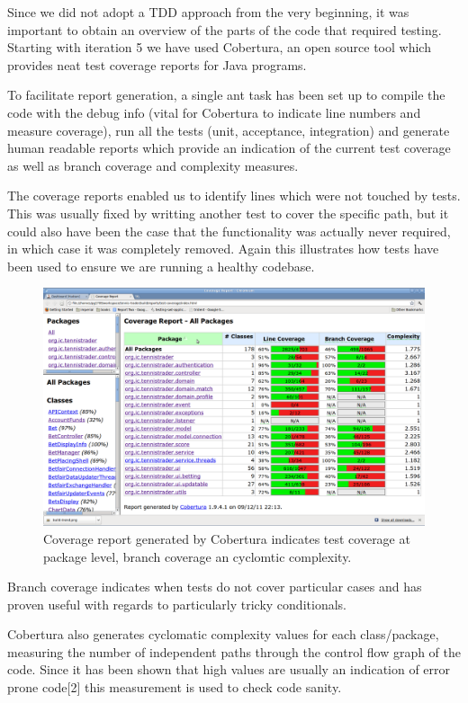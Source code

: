 \documentclass[10pt]{article}
\begin{document}
Since we did not adopt a TDD approach from the very beginning, it was important to obtain an overview of the parts of the code that required testing. Starting with iteration 5 we have used Cobertura,  an open source tool which provides neat test coverage reports for Java programs.

To facilitate report generation, a single ant task has been set up to compile the code with the debug info (vital for Cobertura to indicate line numbers and measure coverage), run all the tests (unit, acceptance, integration) and generate human readable reports which provide an indication of the current test coverage as well as branch coverage and complexity measures.

The coverage reports enabled us to identify lines which were not touched by tests. This was usually fixed by writting another test to cover the specific path, but it could also have been the case that the functionality was actually never required, in which case it was completely removed. Again this illustrates how tests have been used to ensure we are running a healthy codebase.

\begin{figure}[ht]
\centering
\includegraphics[bb=0 0 1680 1050, scale = 0.2]{coverage.png}
\caption{Coverage report generated by Cobertura indicates test coverage at package level, branch coverage an cyclomtic complexity.}
\end{figure}

Branch coverage indicates when tests do not cover particular cases and has proven useful with regards to particularly tricky conditionals.

Cobertura also generates cyclomatic complexity values for each class/package, measuring the number of independent paths through the control flow graph of the code. Since it has been shown that high values are usually an indication of error prone code[2] this measurement is used to check code sanity.
\end{document}
